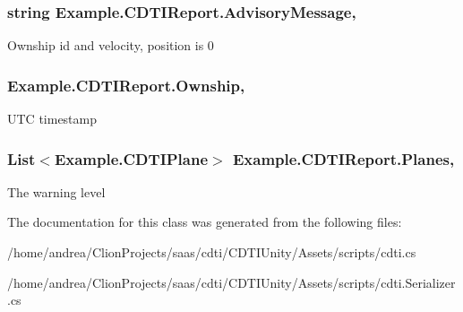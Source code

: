 \subsubsection[{\texorpdfstring{Advisory\+Message}{AdvisoryMessage}}]{\setlength{\rightskip}{0pt plus 5cm}string Example.\+C\+D\+T\+I\+Report.\+Advisory\+Message\hspace{0.3cm}{\ttfamily [get]}, {\ttfamily [set]}}\hypertarget{class_example_1_1_c_d_t_i_report_a6859a3fc5d356d9125d589e23a6cc2b9}{}\label{class_example_1_1_c_d_t_i_report_a6859a3fc5d356d9125d589e23a6cc2b9}


Ownship id and velocity, position is 0

\subsubsection[{\texorpdfstring{Ownship}{Ownship}}]{ Example.\+C\+D\+T\+I\+Report.\+Ownship\hspace{0.3cm}{\ttfamily [get]}, {\ttfamily [set]}}\hypertarget{class_example_1_1_c_d_t_i_report_ad40efe2d19d10dabc930320ba2835337}{}\label{class_example_1_1_c_d_t_i_report_ad40efe2d19d10dabc930320ba2835337}


U\+TC timestamp

\subsubsection[{\texorpdfstring{Planes}{Planes}}]{\setlength{\rightskip}{0pt plus 5cm}List$<${\bf Example.\+C\+D\+T\+I\+Plane}$>$ Example.\+C\+D\+T\+I\+Report.\+Planes\hspace{0.3cm}{\ttfamily [get]}, {\ttfamily [set]}}\hypertarget{class_example_1_1_c_d_t_i_report_a73959c38addf562d6b64ecb538db006a}{}\label{class_example_1_1_c_d_t_i_report_a73959c38addf562d6b64ecb538db006a}


The warning level



The documentation for this class was generated from the following files\+:\begin{DoxyCompactItemize}
\item 
/home/andrea/\+Clion\+Projects/saas/cdti/\+C\+D\+T\+I\+Unity/\+Assets/scripts/cdti.\+cs\item 
/home/andrea/\+Clion\+Projects/saas/cdti/\+C\+D\+T\+I\+Unity/\+Assets/scripts/cdti.\+Serializer.\+cs\end{DoxyCompactItemize}
